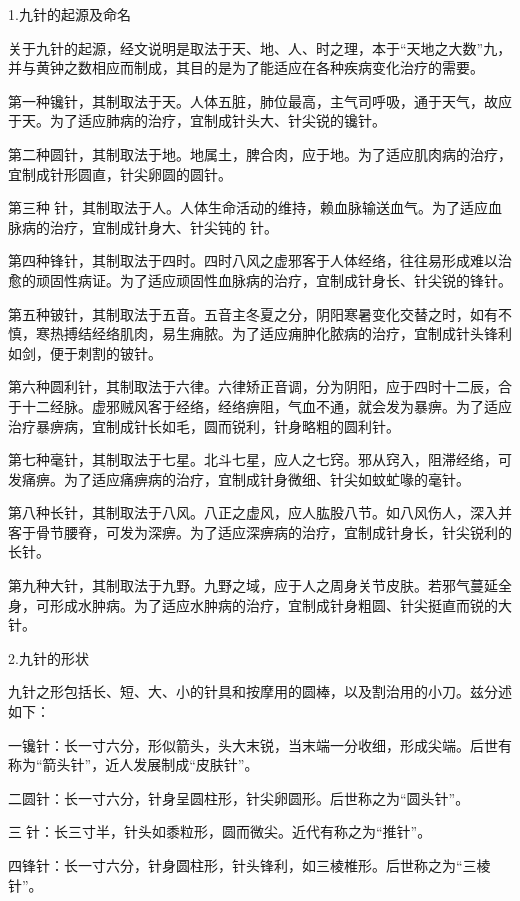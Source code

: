 \documentclass[12pt]{ctexbook}%
\begin{document}

1.九针的起源及命名

关于九针的起源，经文说明是取法于天、地、人、时之理，本于“天地之大数”九，并与黄钟之数相应而制成，其目的是为了能适应在各种疾病变化治疗的需要。

第一种镵针，其制取法于天。人体五脏，肺位最高，主气司呼吸，通于天气，故应于天。为了适应肺病的治疗，宜制成针头大、针尖锐的镵针。

第二种圆针，其制取法于地。地属土，脾合肉，应于地。为了适应肌肉病的治疗，宜制成针形圆直，针尖卵圆的圆针。

第三种𫔂针，其制取法于人。人体生命活动的维持，赖血脉输送血气。为了适应血脉病的治疗，宜制成针身大、针尖钝的𫔂针。

第四种锋针，其制取法于四时。四时八风之虚邪客于人体经络，往往易形成难以治愈的顽固性病证。为了适应顽固性血脉病的治疗，宜制成针身长、针尖锐的锋针。

第五种铍针，其制取法于五音。五音主冬夏之分，阴阳寒暑变化交替之时，如有不慎，寒热搏结经络肌肉，易生痈脓。为了适应痈肿化脓病的治疗，宜制成针头锋利如剑，便于刺割的铍针。

第六种圆利针，其制取法于六律。六律矫正音调，分为阴阳，应于四时十二辰，合于十二经脉。虚邪贼风客于经络，经络痹阻，气血不通，就会发为暴痹。为了适应治疗暴痹病，宜制成针长如毛，圆而锐利，针身略粗的圆利针。

第七种毫针，其制取法于七星。北斗七星，应人之七窍。邪从窍入，阻滞经络，可发痛痹。为了适应痛痹病的治疗，宜制成针身微细、针尖如蚊虻喙的毫针。

第八种长针，其制取法于八风。八正之虚风，应人肱股八节。如八风伤人，深入并客于骨节腰脊，可发为深痹。为了适应深痹病的治疗，宜制成针身长，针尖锐利的长针。

第九种大针，其制取法于九野。九野之域，应于人之周身关节皮肤。若邪气蔓延全身，可形成水肿病。为了适应水肿病的治疗，宜制成针身粗圆、针尖挺直而锐的大针。

2.九针的形状

九针之形包括长、短、大、小的针具和按摩用的圆棒，以及割治用的小刀。兹分述如下：

一镵针：长一寸六分，形似箭头，头大末锐，当末端一分收细，形成尖端。后世有称为“箭头针”，近人发展制成“皮肤针”。

二圆针：长一寸六分，针身呈圆柱形，针尖卵圆形。后世称之为“圆头针”。

三𫔂针：长三寸半，针头如黍粒形，圆而微尖。近代有称之为“推针”。

四锋针：长一寸六分，针身圆柱形，针头锋利，如三棱椎形。后世称之为“三棱针”。
\end{document}
